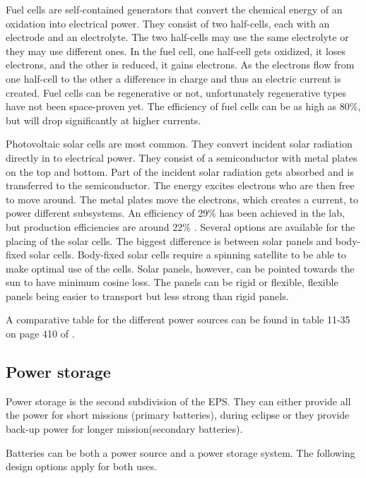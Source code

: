 Fuel cells are self-contained generators that convert the chemical energy of an oxidation into electrical power. They consist of two half-cells, each with an electrode and an electrolyte. The two half-cells may use the same electrolyte or they may use different ones.
In the fuel cell, one half-cell gets oxidized, it loses electrons, and the other is reduced, it gains electrons. As the electrons flow from
one half-cell to the other a difference in charge and thus an electric current is created. Fuel cells can be regenerative or not, unfortunately regenerative types have not been space-proven yet\cite{rees}.
The efficiency of fuel cells can be as high as 80\%, but will drop significantly at higher currents.

Photovoltaic solar cells are most common. They convert incident solar radiation directly in to electrical power. They consist of a semiconductor with metal plates on the top and bottom. Part of the incident solar radiation gets absorbed and is transferred to the
semiconductor. The energy excites electrons who are then free to move around. The metal plates move the electrons, which creates a current,
to power different subsystems. An efficiency of 29\% has been achieved \cite{doody1} in the lab, but production efficiencies are around 22\% \cite{larson}. Several options are available for the placing of the solar cells. The biggest difference is between solar panels and body-fixed solar cells. Body-fixed solar cells require a spinning satellite to be able to make optimal use of the cells. Solar panels, however, can be pointed towards the sun to have minimum cosine loss. The panels can be rigid or flexible, flexible panels being easier to transport but less strong than rigid panels.

A comparative table for the different power sources can be found in table 11-35 on page 410 of \cite{larson}.

\subsection{Power storage}
\label{blDOstorage}

Power storage is the second subdivision of the \ac{EPS}. They can either provide all the power for short missions (primary batteries), during eclipse or they provide back-up power for longer mission(secondary batteries).

Batteries can be both a power source and a power storage system. The following design options apply for both uses.

